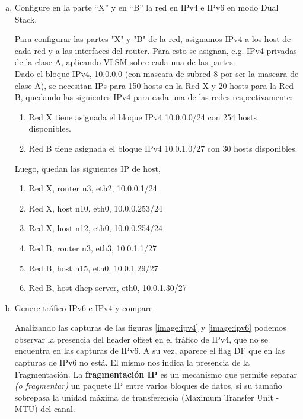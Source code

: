 \documentclass[osajnl,twocolumn,showpacs,superscriptaddress,10pt]{revtex4-1} %
\begin{document}
\begin{enumerate}[a)]
    \item Configure en la parte “X” y en “B” la red en IPv4 e IPv6 en modo Dual Stack.
    
    Para configurar las partes "X" y "B" de la red, asignamos IPv4 a los host de cada red y a las interfaces del router.
    Para esto se asignan, e.g. IPv4 privadas de la clase A, aplicando VLSM sobre cada una de las partes. \\

    Dado el bloque IPv4, 10.0.0.0 (con mascara de subred 8 por ser la mascara de clase A), se necesitan IPs para 150 hosts en la Red X y 20 hosts para la Red B,
    quedando las siguientes IPv4 para cada una de las redes respectivamente: \\

    \begin{enumerate}[1.]
        \item Red X tiene asignada el bloque IPv4 10.0.0.0/24 con 254 hosts disponibles.
        \item Red B tiene asignada el bloque IPv4 10.0.1.0/27 con 30 hosts disponibles.
    \end{enumerate}

    Luego, quedan las siguientes IP de host,

    \begin{enumerate}[1.]
        \item Red X, router n3, eth2, 10.0.0.1/24
        \item Red X, host n10, eth0, 10.0.0.253/24
        \item Red X, host n12, eth0, 10.0.0.254/24
        \item Red B, router n3, eth3, 10.0.1.1/27
        \item Red B, host n15, eth0, 10.0.1.29/27 
        \item Red B, host dhcp-server, eth0, 10.0.1.30/27
    \end{enumerate}
    
    \item Genere tráfico IPv6 e IPv4 y compare.
    
    Analizando las capturas de las figuras \ref{image:ipv4} y \ref{image:ipv6} podemos observar la presencia del header offset en el tráfico de IPv4,
    que no se encuentra en las capturas de IPv6. A su vez, aparece el flag DF que en las capturas de IPv6 no está.
    El mismo nos indica la presencia de la Fragmentación. La \textbf{fragmentación IP} es un mecanismo que permite separar 
    \textit{(o fragmentar)} un paquete IP entre varios bloques de datos, si su tamaño sobrepasa la unidad 
    máxima de transferencia (Maximum Transfer Unit - MTU) del canal. \\


\end{enumerate}
\end{document}
